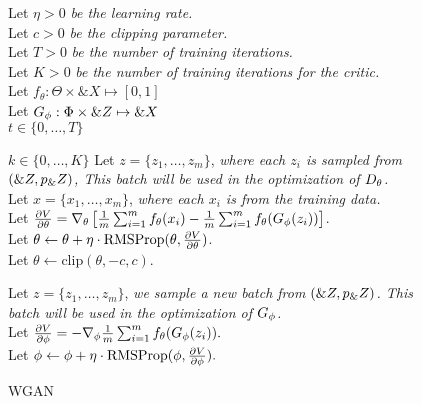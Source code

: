 \begin{figure}[H]
  \centering
  \begin{minipage}{\linewidth}
    \begin{algorithm}[H]
      Let $\eta > 0$ \textit{be the learning rate.} \\
      Let $c > 0$ \textit{be the clipping parameter.} \\
      Let $T > 0$ \textit{be the number of training iterations.} \\
      Let $K > 0$ \textit{be the number of training iterations for the
        critic.} \\
      Let $f_\theta: \Theta \times \&X \mapsto [0, 1]$ \\
      Let $G_\phi: \Phi \times \&Z \mapsto \&X$ \\
      \For%
      {$t \in \{0, \dots, T\}$} { \For%
        {$k \in \{0, \dots, K\}$} { Let $z = \{z_1, \dots, z_m\}$,
          \textit{where each $z_i$ is sampled from $(\&Z, p_\&Z)$, This
            batch will be used in the optimization of
            $D_\theta$.} \\
          Let $x = \{x_1, \dots, x_m\}$, \textit{where each
            $x_i$ is from the training data.} \\
          Let
          ${\partial{V} \over \partial{\theta}} = \nabla_\theta\left[
            {1 \over m} \sum_{i=1}^m f_{\theta}(x_i) - {1 \over m}
            \sum_{i=1}^m f_{\theta}(G_\phi(z_i))\right]$. \\
          Let $\theta \gets \theta + \eta \cdot \text{RMSProp}(\theta,
          {\partial{V} \over \partial{\theta}})$. \\

          Let $\theta \gets \text{clip}(\theta, -c, c)$.
        }

        Let $z = \{z_1, \dots, z_m\}$, \textit{we sample a new batch
          from $(\&Z, p_\&Z)$. This batch will be used in the
          optimization of
          $G_\phi$.} \\

        Let
        ${\partial{V} \over \partial{\phi}} = - \nabla_\phi{1 \over m}
        \sum_{i=1}^m f_{\theta}(G_\phi(z_i)).$ \\

        Let
        $\phi \gets \phi + \eta \cdot \text{RMSProp}(\phi,
        {\partial{V} \over \partial{\phi}}).$ \\
      }
      \caption{WGAN}
      \label{algo:wgawgann-algo}
    \end{algorithm}
  \end{minipage}
\end{figure}

